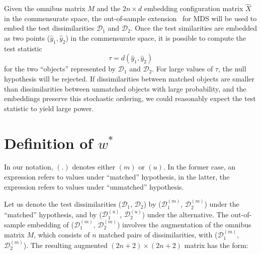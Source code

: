 \documentclass[12pt,oneside,final]{thesis}\usepackage[]{graphicx}\usepackage[]{color}
\begin{document}
  Given the omnibus matrix $M$ and the $2n \times d$ embedding configuration matrix $\hat{X}$ in the commensurate space, the out-of-sample extension~\cite{TrossetOOS} for MDS will be used to embed the test dissimilarities $\mathcal{D}_1$ and $\mathcal{D}_2$.  Once the test similarities are embedded as two points ($\hat{y}_{1},\hat{y}_{2}$) in  the commensurate space, it is possible to  compute the test statistic \[
\tau=d\left(\hat{y}_{1},\hat{y}_{2}\right)\label{teststat}
\] for the two ``objects'' represented by  $\mathcal{D}_1$ and $\mathcal{D}_2$.  For large values of $\tau$, the null hypothesis will be rejected. 
   If  dissimilarities between matched objects are smaller than dissimilarities between unmatched objects with large probability, and the embeddings preserve this stochastic ordering,  we could reasonably expect the test statistic to yield large  power. 
   
   

\section{Definition of  $w^{*}$}

\begin{remark}
In our notation, $(.)$  denotes  either $(m)$  or   $(u)$. In the former case, an expression refers to values under  ``matched'' hypothesis, in the latter, the expression refers to values under  ``unmatched''   hypothesis.
\end{remark}
Let us denote the test dissimilarities ($\mathcal{D}_1$, $\mathcal{D}_2$)  by  ($\mathcal{D}_1^{(m)}$, $\mathcal{D}_2^{(m)}$)  under the  ``matched'' hypothesis, and  by ($\mathcal{D}_1^{(u)}$, $\mathcal{D}_2^{(u)}$)  under the alternative. The out-of-sample embedding of ($\mathcal{D}_1^{(m)}$, $\mathcal{D}_2^{(m)}$) involves the  augmentation of  the omnibus matrix $M$, which consists of $n$ matched  pairs of dissimilarities,  with ($\mathcal{D}_1^{(m)}$, $\mathcal{D}_2^{(m)}$). The resulting augmented  $(2n+2)\times (2n+2)$ matrix  has the form:
\end{document}

